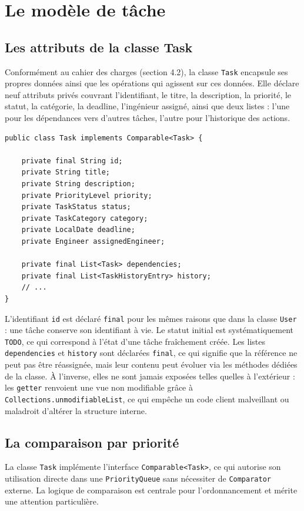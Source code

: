 \documentclass[11pt]{article}
\begin{document}
\section{Le modèle de tâche}

\subsection{Les attributs de la classe Task}
Conformément au cahier des charges (section 4.2), la classe \texttt{Task}
encapsule ses propres données ainsi que les opérations qui agissent sur
ces données. Elle déclare neuf attributs privés couvrant l'identifiant,
le titre, la description, la priorité, le statut, la catégorie, la
deadline, l'ingénieur assigné, ainsi que deux listes : l'une pour les
dépendances vers d'autres tâches, l'autre pour l'historique des actions.

\begin{lstlisting}[caption={Attributs principaux de Task}]
public class Task implements Comparable<Task> {

    private final String id;
    private String title;
    private String description;
    private PriorityLevel priority;
    private TaskStatus status;
    private TaskCategory category;
    private LocalDate deadline;
    private Engineer assignedEngineer;

    private final List<Task> dependencies;
    private final List<TaskHistoryEntry> history;
    // ...
}
\end{lstlisting}

L'identifiant \texttt{id} est déclaré \texttt{final} pour les mêmes
raisons que dans la classe \texttt{User} : une tâche conserve son
identifiant à vie. Le statut initial est systématiquement \texttt{TODO},
ce qui correspond à l'état d'une tâche fraîchement créée. Les listes
\texttt{dependencies} et \texttt{history} sont déclarées \texttt{final},
ce qui signifie que la référence ne peut pas être réassignée, mais leur
contenu peut évoluer via les méthodes dédiées de la classe. À l'inverse,
elles ne sont jamais exposées telles quelles à l'extérieur : les
\texttt{getter} renvoient une vue non modifiable grâce à
\texttt{Collections.unmodifiableList}, ce qui empêche un code client
malveillant ou maladroit d'altérer la structure interne.

\subsection{La comparaison par priorité}
La classe \texttt{Task} implémente l'interface \texttt{Comparable<Task>},
ce qui autorise son utilisation directe dans une \texttt{PriorityQueue}
sans nécessiter de \texttt{Comparator} externe. La logique de comparaison
est centrale pour l'ordonnancement et mérite une attention particulière.
\end{document}
